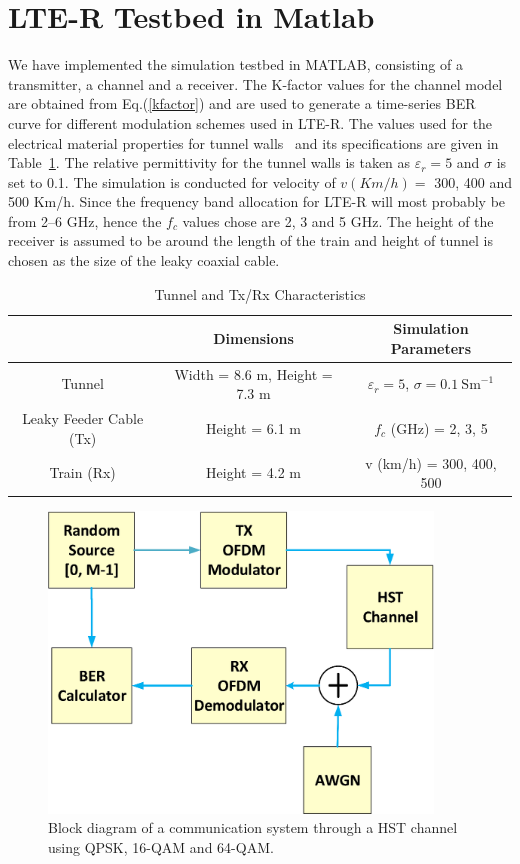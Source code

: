 \section{LTE-R Testbed in Matlab}

We have implemented the simulation testbed in MATLAB, consisting of a transmitter, a channel and a receiver. The K-factor values for the channel model are obtained from Eq.(\ref{kfactor}) and are used to generate a time-series BER curve for different modulation schemes used in LTE-R. The values used for the electrical material properties for tunnel walls~\cite{lter17} and its
specifications are given in Table~\ref{tablelter}. The relative permittivity for the tunnel walls is taken as $\varepsilon_r = 5$ and $\sigma$ is set to 0.1. The simulation is conducted for velocity of $v (Km/h) = $ 300, 400 and 500 Km/h. Since the frequency band allocation for LTE-R will most probably be from 2--6 GHz, hence the $f_c$ values chose are 2, 3 and 5 GHz. The height of the receiver is assumed to be around the length of the train and height of tunnel is chosen as the size of the leaky coaxial cable.

\begin{table}[t!]
\centering
\caption{Tunnel and Tx/Rx Characteristics}
\begin{tabular}{c  c  c }
   & Dimensions & Simulation Parameters\\\hline
Tunnel & Width = 8.6 m, Height = 7.3 m & $\varepsilon_r = 5$, $\sigma = 0.1~\textrm{Sm}^{-1}$\\\hline
Leaky Feeder Cable (Tx) & Height = 6.1 m & $f_c$ (GHz) = 2, 3, 5\\\hline
Train (Rx) & Height = 4.2 m &  v (km/h) = 300, 400, 500\\
\hline
\end{tabular}
\label{tablelter}
\end{table}

\begin{figure}[!ht]
\label{finalblock}
\centering
\includegraphics[width=\textwidth,height=8cm,keepaspectratio]{images/Gill/lte_figs/finalblock.eps} 
\caption{Block diagram of a communication system through a HST channel using QPSK, 16-QAM and 64-QAM.}
\end{figure}

